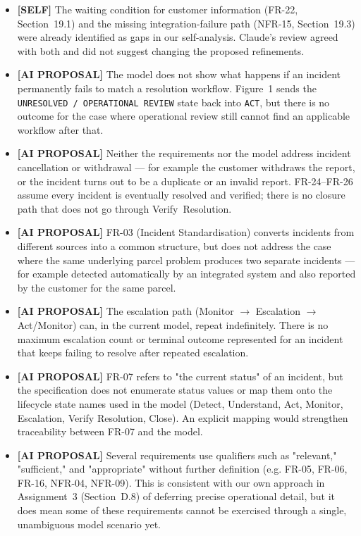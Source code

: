 \documentclass[11pt,a4paper]{article}
\begin{document}
\begin{itemize}
  \item \textbf{[SELF]} The waiting condition for customer information (FR-22, Section~19.1) and the missing integration-failure path (NFR-15, Section~19.3) were already identified as gaps in our self-analysis. Claude's review agreed with both and did not suggest changing the proposed refinements.
  \item \textbf{[AI PROPOSAL]} The model does not show what happens if an incident permanently fails to match a resolution workflow. Figure~1 sends the \texttt{UNRESOLVED / OPERATIONAL REVIEW} state back into \texttt{ACT}, but there is no outcome for the case where operational review still cannot find an applicable workflow after that.
  \item \textbf{[AI PROPOSAL]} Neither the requirements nor the model address incident cancellation or withdrawal — for example the customer withdraws the report, or the incident turns out to be a duplicate or an invalid report. FR-24–FR-26 assume every incident is eventually resolved and verified; there is no closure path that does not go through Verify~Resolution.
  \item \textbf{[AI PROPOSAL]} FR-03 (Incident Standardisation) converts incidents from different sources into a common structure, but does not address the case where the same underlying parcel problem produces two separate incidents — for example detected automatically by an integrated system and also reported by the customer for the same parcel.
  \item \textbf{[AI PROPOSAL]} The escalation path (Monitor $\rightarrow$ Escalation $\rightarrow$ Act/Monitor) can, in the current model, repeat indefinitely. There is no maximum escalation count or terminal outcome represented for an incident that keeps failing to resolve after repeated escalation.
  \item \textbf{[AI PROPOSAL]} FR-07 refers to "the current status" of an incident, but the specification does not enumerate status values or map them onto the lifecycle state names used in the model (Detect, Understand, Act, Monitor, Escalation, Verify Resolution, Close). An explicit mapping would strengthen traceability between FR-07 and the model.
  \item \textbf{[AI PROPOSAL]} Several requirements use qualifiers such as "relevant," "sufficient," and "appropriate" without further definition (e.g. FR-05, FR-06, FR-16, NFR-04, NFR-09). This is consistent with our own approach in Assignment~3 (Section~D.8) of deferring precise operational detail, but it does mean some of these requirements cannot be exercised through a single, unambiguous model scenario yet.
\end{itemize}
\end{document}
